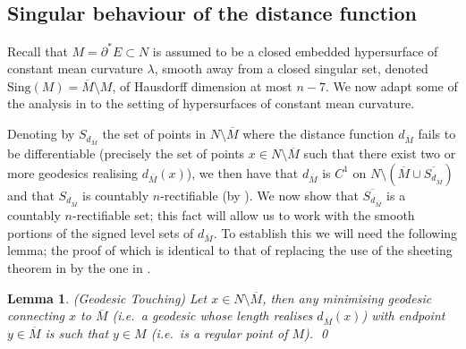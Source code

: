 \documentclass[11pt]{article}
\newtheorem{lem}{Lemma}
\begin{document}
\subsection{Singular behaviour of the distance function}
Recall that $M = \partial^* E \subset N$ is assumed to be a closed embedded hypersurface of constant mean curvature $\lambda$, smooth away from a closed singular set, denoted $\mathrm{Sing}(M) = \overline{M} \setminus M$, of Hausdorff dimension at most $n - 7$. We now adapt some of the analysis in \cite[Section 3]{bellettini} to the setting of hypersurfaces of constant mean curvature.

\bigskip

Denoting by $S_{d_{\overline{M}}}$ the set of points in $N \setminus \overline{M}$ where the distance function $d_{\overline{M}}$ fails to be differentiable (precisely the set of points $x \in N \setminus \overline{M}$ such that there exist two or more geodesics realising $d_{\overline{M}}(x)$), we then have that $d_{\overline{M}}$ is $C^1$ on $N \setminus (\overline{M} \cup \overline{S_{d_{\overline{M}}}})$ and that $S_{d_{\overline{M}}}$ is countably $n$-rectifiable (by \cite{Alberti1994}). We now show that $\overline{S_{d_{\overline{M}}}}$ is a countably $n$-rectifiable set; this fact will allow us to work with the smooth portions of the signed level sets of $d_{\overline{M}}$. To establish this we will need the following lemma; the proof of which is identical to that of \cite[Lemma 3.1]{bellettini} replacing the use of the sheeting theorem in \cite{wickramasekera} by the one in \cite{bellettini-wickramasekera-pmc-reg}.

\begin{lem}\label{lem: geodesic touching} (Geodesic Touching)
Let $x \in N \setminus \overline{M}$, then any minimising geodesic connecting $x$ to $\overline{M}$ (i.e.~a geodesic whose length realises $d_{\overline{M}}(x)$) with endpoint $y \in \overline{M}$ is such that $y \in M$ (i.e.~is a regular point of $M$). \qed
\end{lem}
\end{document}
